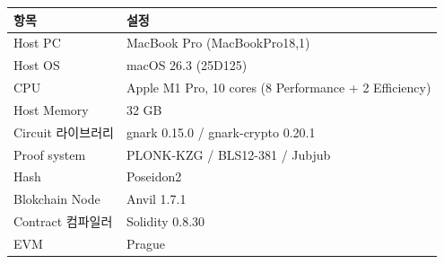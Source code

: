\begin{center}\small\begin{tabular}{@{}ll@{}}\toprule
        \textbf{항목}    & \textbf{설정}                                           \\
        \midrule
        Host PC        & MacBook Pro (MacBookPro18,1)                          \\
        Host OS        & macOS 26.3 (25D125)                                   \\
        CPU            & Apple M1 Pro, 10 cores (8 Performance + 2 Efficiency) \\
        Host Memory    & 32 GB                                                 \\
        \midrule
        Circuit 라이브러리  & gnark 0.15.0 / gnark-crypto 0.20.1                    \\
        Proof system   & PLONK-KZG / BLS12-381 / Jubjub                        \\
        Hash           & Poseidon2                                             \\
        Blokchain Node & Anvil 1.7.1                                           \\
        Contract 컴파일러  & Solidity 0.8.30                                       \\
        EVM            & Prague                                                \\
        \bottomrule\end{tabular}\end{center}
